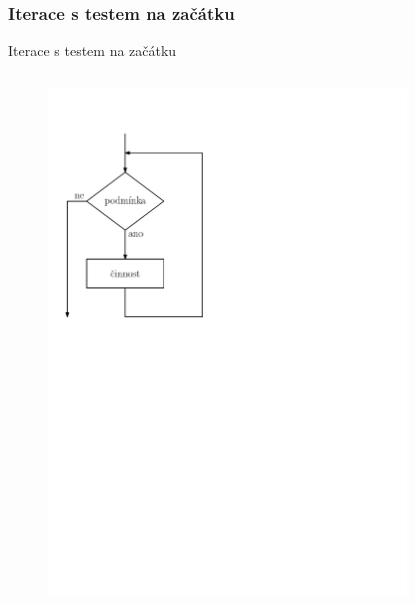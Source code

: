\documentclass[11pt,aspectratio=169]{beamer}
\begin{document}
    \subsubsection{Iterace s testem na začátku}
    \begin{frame}{Iterace s testem na začátku}
        \begin{columns}
            \begin{column}{.5\textwidth}
                \begin{figure}
                    \centering
                    \includegraphics[scale=.5]{../images/00-vyvojak-iterace-zacatek.pdf}
                \end{figure}
            \end{column}
            \begin{column}{.5\textwidth}
                \begin{figure}

\end{figure}
\end{column}
\end{columns}
\end{frame}
\end{document}
